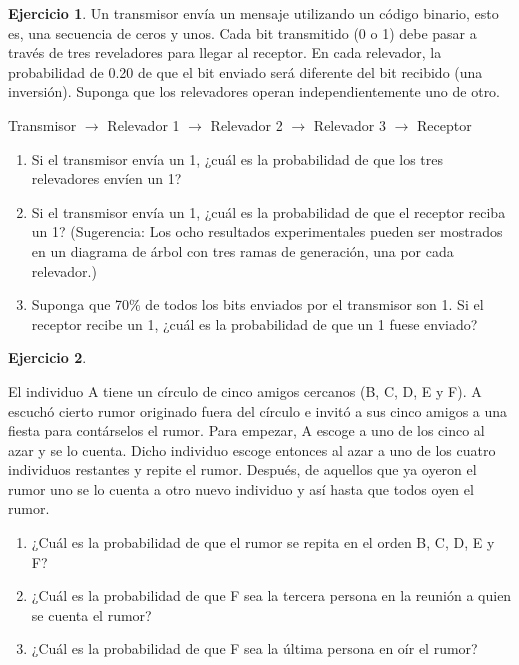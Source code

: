 \documentclass[
  11pt,
]{book}
\theoremstyle{definition}
\theoremstyle{definition}
\theoremstyle{definition}
\newtheorem{exercise}{Ejercicio}[chapter]
\theoremstyle{definition}
\theoremstyle{remark}
\begin{document}
\begin{exercise}

Un transmisor envía un mensaje utilizando un código binario, esto es, una secuencia de ceros y unos. Cada bit transmitido (0 o 1) debe pasar a través de tres reveladores para llegar al receptor. En cada relevador, la probabilidad de 0.20 de que el bit enviado será diferente del bit recibido (una inversión). Suponga que los relevadores operan independientemente uno de otro.

Transmisor \(\rightarrow\) Relevador 1 \(\rightarrow\) Relevador 2 \(\rightarrow\) Relevador 3 \(\rightarrow\) Receptor

\begin{enumerate}
\def\labelenumi{\alph{enumi}.}
\item
  Si el transmisor envía un 1, ¿cuál es la probabilidad de que los tres relevadores envíen un 1?
\item
  Si el transmisor envía un 1, ¿cuál es la probabilidad de que el receptor reciba un 1? (Sugerencia: Los ocho resultados experimentales pueden ser mostrados en un diagrama de árbol con tres ramas de generación, una por cada relevador.)
\item
  Suponga que 70\% de todos los bits enviados por el transmisor son 1. Si el receptor recibe un 1, ¿cuál es la probabilidad de que un 1 fuese enviado?\\
\end{enumerate}

\end{exercise}

\begin{exercise}
\protect\hypertarget{exr:ejercicio95}{}\label{exr:ejercicio95}

El individuo A tiene un círculo de cinco amigos cercanos (B, C, D, E y F). A escuchó cierto rumor originado fuera del círculo e invitó a sus cinco amigos a una fiesta para contárselos el rumor. Para empezar, A escoge a uno de los cinco al azar y se lo cuenta. Dicho individuo escoge entonces al azar a uno de los cuatro individuos restantes y repite el rumor. Después, de aquellos que ya oyeron el rumor uno se lo cuenta a otro nuevo individuo y así hasta que todos oyen el rumor.

\begin{enumerate}
\def\labelenumi{\alph{enumi}.}
\item
  ¿Cuál es la probabilidad de que el rumor se repita en el orden B, C, D, E y F?
\item
  ¿Cuál es la probabilidad de que F sea la tercera persona en la reunión a quien se cuenta el rumor?
\item
  ¿Cuál es la probabilidad de que F sea la última persona en oír el rumor?
\end{enumerate}

\end{exercise}
\end{document}
